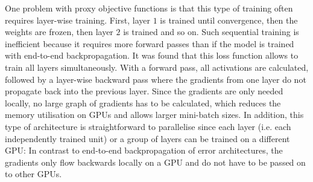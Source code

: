 One problem with proxy objective functions is that this type of training often requires layer-wise training. First, layer $1$ is trained until convergence, then the weights are frozen, then layer $2$ is trained and so on.
Such sequential training is inefficient because it requires more forward passes than if the model is trained with end-to-end backpropagation.
It was found that this loss function allows to train all layers simultaneously. With a forward pass, all activations are calculated, followed by a layer-wise backward pass where the gradients from one layer do not propagate back into the previous layer.
Since the gradients are only needed locally, no large graph of gradients has to be calculated, which reduces the memory utilisation on GPUs and allows larger mini-batch sizes. In addition, this type of architecture is straightforward to parallelise since each layer (i.e. each independently trained unit) or a group of layers can be trained on a different GPU:
In contrast to end-to-end backpropagation of error architectures, the gradients only flow backwards locally on a GPU and do not have to be passed on to other GPUs.

